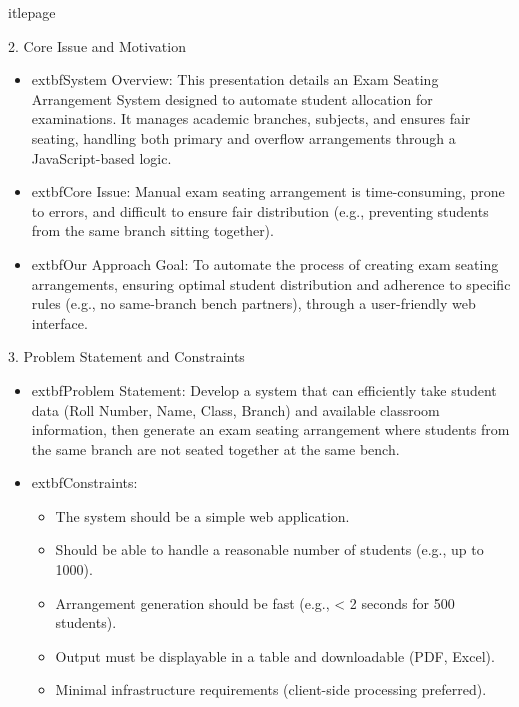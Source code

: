 \documentclass{beamer}
\author{Dhruthiya, Aasifa, Hasini, Sriya, Navya}
\date{	oday}
\begin{document}
\begin{frame}
    	itlepage
\end{frame}

\begin{frame}{2. Core Issue and Motivation}
    \begin{itemize}
        \item 	extbf{System Overview:} This presentation details an Exam Seating Arrangement System designed to automate student allocation for examinations. It manages academic branches, subjects, and ensures fair seating, handling both primary and overflow arrangements through a JavaScript-based logic.
        \item 	extbf{Core Issue:} Manual exam seating arrangement is time-consuming, prone to errors, and difficult to ensure fair distribution (e.g., preventing students from the same branch sitting together).
        \item 	extbf{Our Approach Goal:} To automate the process of creating exam seating arrangements, ensuring optimal student distribution and adherence to specific rules (e.g., no same-branch bench partners), through a user-friendly web interface.
    \end{itemize}
\end{frame}

\begin{frame}{3. Problem Statement and Constraints}
    \begin{itemize}
        \item 	extbf{Problem Statement:} Develop a system that can efficiently take student data (Roll Number, Name, Class, Branch) and available classroom information, then generate an exam seating arrangement where students from the same branch are not seated together at the same bench.
        \item 	extbf{Constraints:}
            \begin{itemize}
                \item The system should be a simple web application.
                \item Should be able to handle a reasonable number of students (e.g., up to 1000).
                \item Arrangement generation should be fast (e.g., < 2 seconds for 500 students).
                \item Output must be displayable in a table and downloadable (PDF, Excel).
                \item Minimal infrastructure requirements (client-side processing preferred).
            \end{itemize}
    \end{itemize}
\end{frame}
\end{document}
